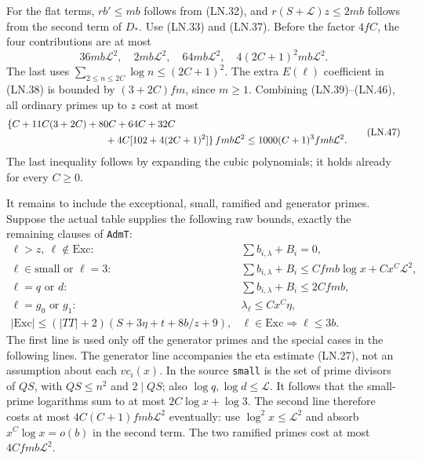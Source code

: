 For the flat terms, $rb'\le mb$ follows from (LN.32), and
$r(S+\mathcal L)z\le2mb$ follows from the second term of $D_*$.
Use (LN.33) and (LN.37).  Before the factor $4fC$, the four
contributions are at most
\[
 36mb\mathcal L^2,\quad2mb\mathcal L^2,\quad
 64mb\mathcal L^2,\quad4(2C+1)^2mb\mathcal L^2.
 \tag{LN.46}
\]
The last uses
$\sum_{2\le n\le2C}\log n\le(2C+1)^2$.
The extra $E(\ell)$ coefficient in (LN.38) is bounded by
$(3+2C)fm$, since $m\ge1$.  Combining (LN.39)--(LN.46), all
ordinary primes up to $z$ cost at most
\[
 \begin{split}
 &\{C+11C(3+2C)+80C+64C+32C\\
 &\hspace{35mm}+4C[102+4(2C+1)^2]\}\,fmb\mathcal L^2
           \le1000(C+1)^3fmb\mathcal L^2.
 \end{split}                                          \tag{LN.47}
\]
The last inequality follows by expanding the cubic polynomials;
it holds already for every $C\ge0$.

It remains to include the exceptional, small, ramified and generator
primes.  Suppose the actual table supplies the following raw bounds,
exactly the remaining clauses of \texttt{AdmT}:
\[
 \begin{array}{ll}
 \ell>z,\ \ell\notin\mathrm{Exc}:&
              \sum b_{i,\lambda}+B_i=0,\\
 \ell\in\mathrm{small}\text{ or }\ell=3:&
              \sum b_{i,\lambda}+B_i
                   \le Cfmb\log x+Cx^C\mathcal L^2,\\
 \ell=q\text{ or }d:&\sum b_{i,\lambda}+B_i\le2Cfmb,\\
 \ell=g_0\text{ or }g_1:&\lambda_\ell\le Cx^C\eta,\\
 |\mathrm{Exc}|\le(|TT|+2)(S+3\eta+t+8b/z+9),&
                    \ell\in\mathrm{Exc}\Longrightarrow\ell\le3b.
 \end{array}                                                    \tag{LN.48}
\]
The first line is used only off the generator primes and the
special cases in the following lines.  The generator line accompanies
the eta estimate (LN.27), not an assumption about each $v\!c_i(x)$.
In the source \texttt{small} is the set of prime divisors of $QS$,
with $QS\le n^2$ and $2\mid QS$; also $\log q,\log d\le\mathcal L$.
It follows that the small-prime logarithms sum to at most
$2C\log x+\log3$.  The second line therefore costs at most
$4C(C+1)fmb\mathcal L^2$ eventually: use
$\log^2x\le\mathcal L^2$ and absorb
$x^C\log x=o(b)$ in the second term.  The two ramified primes
cost at most $4Cfmb\mathcal L^2$.

